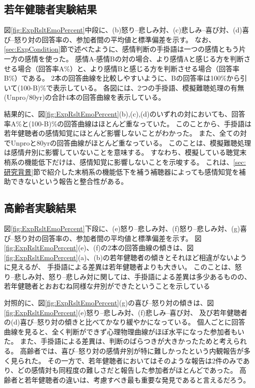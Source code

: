 \subsection{若年健聴者実験結果}
図\ref{fig:ExpRsltEmoPercent}中段に、(b)怒り--悲しみ対、(c)悲しみ--喜び対、(d)喜び--怒り対の回答率の、参加者間の平均値と標準偏差を示す。
なお、\ref{sec:ExpCondition}節で述べたように、感情判断の手掛語は一つの感情ともう片一方の感情を使った。
感情A-感情Bの対の場合、より感情Aと感じる方を判断させる場合（回答率A\%）と、より感情Bと感じる方を判断させる場合（回答率B\%）である。
2本の回答曲線を比較しやすいように、Bの回答率は100\%から引いて(100-B)\%で表示している。
各図には、2つの手掛語、模擬難聴処理の有無(Unpro/80yr)の合計4本の回答曲線を表示している。

結果的に、図\ref{fig:ExpRsltEmoPercent}(b),(c),(d)のいずれの対においても、回答率A\%と(100-B)\%の回答曲線はほとんど重なっていた。
このことから、手掛語は若年健聴者の感情知覚にほとんど影響しないことがわかった。
また、全ての対でUnproと80yrの回答曲線がほとんど重なっている。
このことは、模擬難聴処理は感情弁別に影響していないことを意味する。
すなわち、模擬している聴覚末梢系の機能低下だけは、感情知覚に影響しないことを示唆する。
これは、\ref{sec:研究背景}節で紹介した末梢系の機能低下を補う補聴器によっても感情知覚を補助できないという報告\cite{goy2018hearing}と整合性がある。


\subsection{高齢者実験結果}
図\ref{fig:ExpRsltEmoPercent}下段に、(e)怒り--悲しみ対、(f)怒り--悲しみ対、(g)喜び--怒り対の回答率の、参加者間の平均値と標準偏差を示す。
図\ref{fig:ExpRsltEmoPercent}(e)、(f)の2本の回答曲線の傾きは、図\ref{fig:ExpRsltEmoPercent}(a)、(b)の若年健聴者の傾きとそれほど相違がないように見えるが、
手掛語による差異は若年健聴者よりも大きい。
このことは、怒り--悲しみ対、怒り--悲しみ対に関しては、手掛語による差異は多少あるものの、若年健聴者とおおむね同様な弁別ができたということを示している

対照的に、図\ref{fig:ExpRsltEmoPercent}(g)の喜び--怒り対の傾きは、図\ref{fig:ExpRsltEmoPercent}(e)怒り--悲しみ対、(f)悲しみ--喜び対、
及び若年健聴者の(d)喜び--怒り対の傾きと比べてかなり緩やかになっている。
個人ごとに回答曲線を見ると、全く判断ができず心理物理曲線がほぼ水平になった参加者もいた。
また、手掛語による差異は、判断のばらつきが大きかったためと考えられる。
高齢者では、喜び--怒り対の感情弁別が特に難しかったという内観報告が多く見られた。
その一方で、若年健聴者においてはそのような報告は2件のみであり、どの感情対も同程度の難しさだと報告した参加者がほとんどであった。
高齢者と若年健聴者の違いは、考慮すべき最も重要な発見であると言えるだろう。



